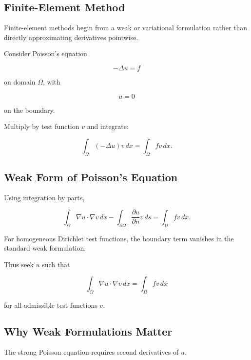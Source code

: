 \subsection{Finite-Element Method}
\label{subsec:finite-element-method}

Finite-element methods begin from a weak or variational formulation rather
than directly approximating derivatives pointwise.

Consider Poisson's equation

\[
\boxed{
-\Delta u=f
}
\]

on domain \(\Omega\), with

\[
u=0
\]

on the boundary.

Multiply by test function \(v\) and integrate:

\[
\boxed{
\int_\Omega
(-\Delta u)v\,dx
=
\int_\Omega
fv\,dx.
}
\]

\subsection{Weak Form of Poisson's Equation}
\label{subsec:weak-form-poisson}

Using integration by parts,

\[
\int_\Omega
\nabla u\cdot\nabla v\,dx
-
\int_{\partial\Omega}
\frac{\partial u}{\partial n}v\,ds
=
\int_\Omega
fv\,dx.
\]

For homogeneous Dirichlet test functions, the boundary term vanishes in
the standard weak formulation.

Thus seek \(u\) such that

\[
\boxed{
\int_\Omega
\nabla u\cdot\nabla v\,dx
=
\int_\Omega
fv\,dx
}
\]

for all admissible test functions \(v\).

\subsection{Why Weak Formulations Matter}
\label{subsec:why-weak-form}

The strong Poisson equation requires second derivatives of \(u\).

